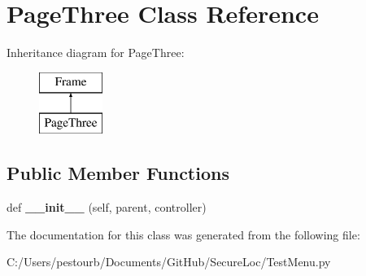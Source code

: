 \hypertarget{class_test_menu_1_1_page_three}{}\section{Page\+Three Class Reference}
\label{class_test_menu_1_1_page_three}
Inheritance diagram for Page\+Three\+:\begin{figure}[H]
\begin{center}
\leavevmode
\includegraphics[height=2.000000cm]{class_test_menu_1_1_page_three}
\end{center}
\end{figure}
\subsection*{Public Member Functions}
\begin{DoxyCompactItemize}
\item 
\mbox{\label{class_test_menu_1_1_page_three_a558d9afc290e8d1ff922f46114f16631}} 
def {\bfseries \+\_\+\+\_\+init\+\_\+\+\_\+} (self, parent, controller)
\end{DoxyCompactItemize}


The documentation for this class was generated from the following file\+:\begin{DoxyCompactItemize}
\item 
C\+:/\+Users/pestourb/\+Documents/\+Git\+Hub/\+Secure\+Loc/Test\+Menu.\+py\end{DoxyCompactItemize}
